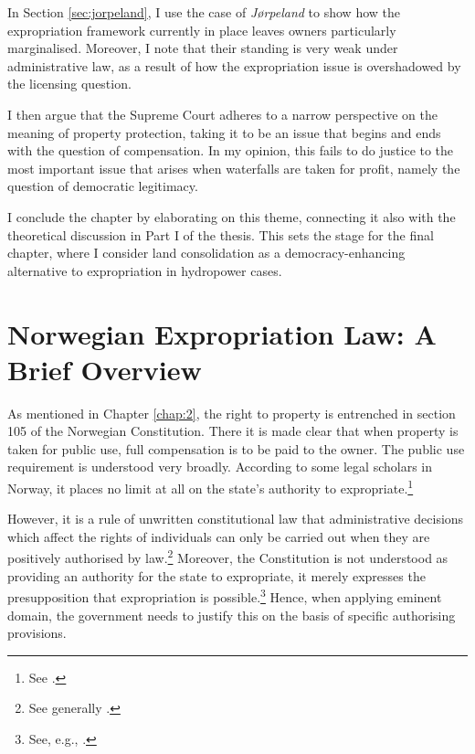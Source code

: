 In Section \ref{sec:jorpeland}, I use the case of {\it Jørpeland} to show how the expropriation framework currently in place leaves owners particularly marginalised. Moreover, I note that their standing is very weak under administrative law, as a result of how the expropriation issue is overshadowed by the licensing question.

I then argue that the Supreme Court adheres to a narrow perspective on the meaning of property protection, taking it to be an issue that begins and ends with the question of compensation. In my opinion, this fails to do justice to the most important issue that arises when waterfalls are taken for profit, namely the question of democratic legitimacy. 

I conclude the chapter by elaborating on this theme, connecting it also with the theoretical discussion in Part I of the thesis. This sets the stage for the final chapter, where I consider land consolidation as a democracy-enhancing alternative to expropriation in hydropower cases.


\section{Norwegian Expropriation Law: A Brief Overview}\label{sec:explaw}

As mentioned in Chapter \ref{chap:2}, the right to property is entrenched in section 105 of the Norwegian Constitution. There it is made clear that when property is taken for public use, full compensation is to be paid to the owner. The public use requirement is understood very broadly. According to some legal scholars in Norway, it places no limit at all on the state's authority to expropriate.\footnote{See \cite[249]{aall04}.}

However, it is a rule of unwritten constitutional law that administrative decisions which affect the rights of individuals can only be carried out when they are positively authorised by law.\footnote{See generally \cite{hogberg11}.} Moreover, the Constitution is not understood as providing an authority for the state to expropriate, it merely expresses the presupposition that expropriation is possible.\footnote{See, e.g., \cite[6]{fleischer86}.} Hence, when applying eminent domain, the government needs to justify this on the basis of specific authorising provisions. 

